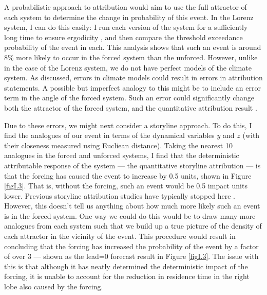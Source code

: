   A probabilistic approach to attribution would aim to use the full attractor of each system to determine the change in probability of this event. In the Lorenz system, I can do this easily: I run each version of the system for a sufficiently long time to ensure ergodicity \citep[here 10 million time units,][]{atencia_analogs_2017}, and then compare the threshold exceedance probability of the event in each. This analysis shows that such an event is around 8\% more likely to occur in the forced system than the unforced. However, unlike in the case of the Lorenz system, we do not have perfect models of the climate system. As discussed, errors in climate models could result in errors in attribution statements. A possible but imperfect analogy to this might be to include an error term in the angle of the forced system. Such an error could significantly change both the attractor of the forced system, and the quantitative attribution result \citep{palmer_nonlinear_1999}.

  Due to these errors, we might next consider a storyline approach. To do this, I find the analogues of our event in terms of the dynamical variables $y$ and $z$ (with their closeness measured using Eucliean distance). Taking the nearest 10 analogues in the forced and unforced systems, I find that the deterministic attributable response of the system --- the quantitative storyline attribution --- is that the forcing has caused the event to increase by 0.5 units, shown in Figure \ref{figI.3}. That is, without the forcing, such an event would be 0.5 impact units lower. Previous storyline attribution studies have typically stopped here \citep{van_garderen_methodology_2021,benitez_july_2022,van_garderen_storyline_2022}. However, this doesn't tell us anything about how much more likely such an event is in the forced system. One way we could do this would be to draw many more analogues from each system such that we build up a true picture of the density of each attractor in the vicinity of the event. This procedure would result in concluding that the forcing has increased the probability of the event by a factor of over 3 --- shown as the lead=0 forecast result in Figure \ref{figI.3}. The issue with this is that although it has neatly determined the deterministic impact of the forcing, it is unable to account for the reduction in residence time in the right lobe also caused by the forcing.


